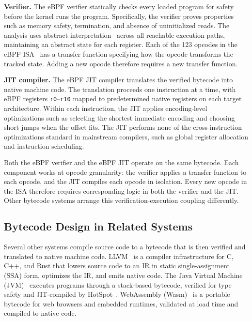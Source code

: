 

\noindent\textbf{Verifier.}
The eBPF verifier statically checks every loaded program for safety before the kernel runs the program. Specifically, the verifier proves properties such as memory safety, termination, and absence of uninitialized reads. The analysis uses abstract interpretation~\cite{gershuni2019simple} across all reachable execution paths, maintaining an abstract state for each register. Each of the 123  opcodes in the eBPF ISA~\cite{rfc9669} has a transfer function specifying how the opcode transforms the tracked state. Adding a new opcode therefore requires a new transfer function.

\noindent\textbf{JIT compiler.}
The eBPF JIT compiler translates the verified bytecode into native machine code. The translation proceeds one instruction at a time, with eBPF registers \texttt{r0}--\texttt{r10} mapped to predetermined native registers on each target architecture. Within each instruction, the JIT applies encoding-level optimizations such as selecting the shortest immediate encoding and choosing short jumps when the offset fits. The JIT performs none of the cross-instruction optimizations standard in mainstream compilers, such as global register allocation and instruction scheduling.

Both the eBPF verifier and the eBPF JIT operate on the same bytecode. Each component works at opcode granularity: the verifier applies a transfer function to each opcode, and the JIT compiles each opcode in isolation. Every new opcode in the ISA therefore requires corresponding logic in both the verifier and the JIT. Other bytecode systems arrange this verification-execution coupling differently.

\subsection{Bytecode Design in Related Systems}
\label{subsec:bytecode}

Several other systems compile source code to a bytecode that is then verified and translated to native machine code. LLVM~\cite{lattner2004llvm} is a compiler infrastructure for C, C++, and Rust that lowers source code to an IR in static single-assignment (SSA) form, optimizes the IR, and emits native code. The Java Virtual Machine (JVM)~\cite{lindholm2012jvms} executes programs through a stack-based bytecode, verified for type safety and JIT-compiled by HotSpot~\cite{paleczny2001java}. WebAssembly (Wasm)~\cite{haas2017bringing} is a portable bytecode for web browsers and embedded runtimes, validated at load time and compiled to native code.

